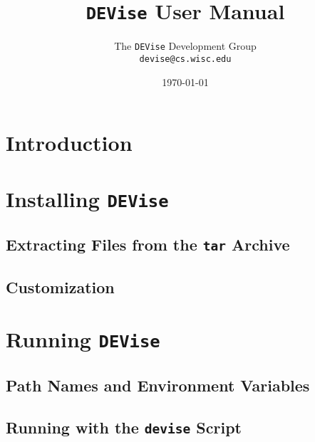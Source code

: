 
\def\Devise{{\tt DEVise} }
\def\filename#1{{\tt #1}}
\def\code#1{{\tt #1}}
\def\menu#1{{\tt #1}}
\def\term#1{#1}
\def\variable#1{{\tt #1}}

\def\scaleepspic[#1]#2#3{
\begin{figure}[htb]
\centering\leavevmode\epsfxsize=#1\epsfbox{#2}
\caption{#3}
\end{figure}
}

\def\fullepspic#1#2{
\begin{figure}[htb]
\centering\leavevmode\epsfxsize=\textwidth\epsfbox{#1}
\caption{#2}
\end{figure}
}


\title{\Devise User Manual}
\author{The \Devise Development Group \\
\code{devise@cs.wisc.edu}
}
\date{\today}

\maketitle

\section{Introduction}

\section{Installing \Devise}

\subsection{Extracting Files from the \code{tar} Archive}

\subsection{Customization}

\section{Running \Devise}

\subsection{Path Names and Environment Variables}

\subsection{Running with the \code{devise} Script}

